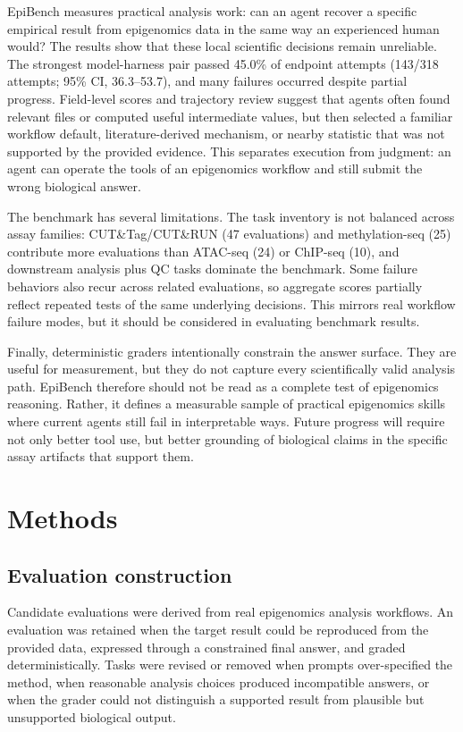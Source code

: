 \documentclass[10pt,letterpaper]{article}
\begin{document}
EpiBench measures practical analysis work: can an agent recover a specific
empirical result from epigenomics data in the same way an experienced human
would? The results show that these local scientific decisions remain
unreliable. The strongest model-harness pair passed 45.0\% of endpoint attempts
(143/318 attempts; 95\% CI, 36.3--53.7), and many failures occurred despite
partial progress. Field-level scores and trajectory review suggest that agents
often found relevant files or computed useful intermediate values, but then
selected a familiar workflow default, literature-derived mechanism, or nearby
statistic that was not supported by the provided evidence. This separates
execution from judgment: an agent can operate the tools of an epigenomics
workflow and still submit the wrong biological answer.

The benchmark has several limitations. The task inventory is not balanced
across assay families: CUT\&Tag/CUT\&RUN (47 evaluations) and methylation-seq
(25) contribute more evaluations than ATAC-seq (24) or ChIP-seq (10), and
downstream analysis plus QC tasks dominate the benchmark. Some failure
behaviors also recur across related evaluations, so aggregate scores partially
reflect repeated tests of the same underlying decisions. This mirrors real
workflow failure modes, but it should be considered in evaluating benchmark
results.

Finally, deterministic graders intentionally constrain the answer surface.
They are useful for measurement, but they do not capture every scientifically
valid analysis path. EpiBench therefore should not be read as a complete test
of epigenomics reasoning. Rather, it defines a measurable sample of practical
epigenomics skills where current agents still fail in interpretable ways.
Future progress will require not only better tool use, but better grounding of
biological claims in the specific assay artifacts that support them.



\section{Methods}

\subsection{Evaluation construction}

Candidate evaluations were derived from real epigenomics analysis workflows.
An evaluation was retained when the target result could be reproduced from the
provided data, expressed through a constrained final answer, and graded
deterministically. Tasks were revised or removed when prompts over-specified
the method, when reasonable analysis choices produced incompatible answers, or
when the grader could not distinguish a supported result from plausible but
unsupported biological output.
\end{document}
